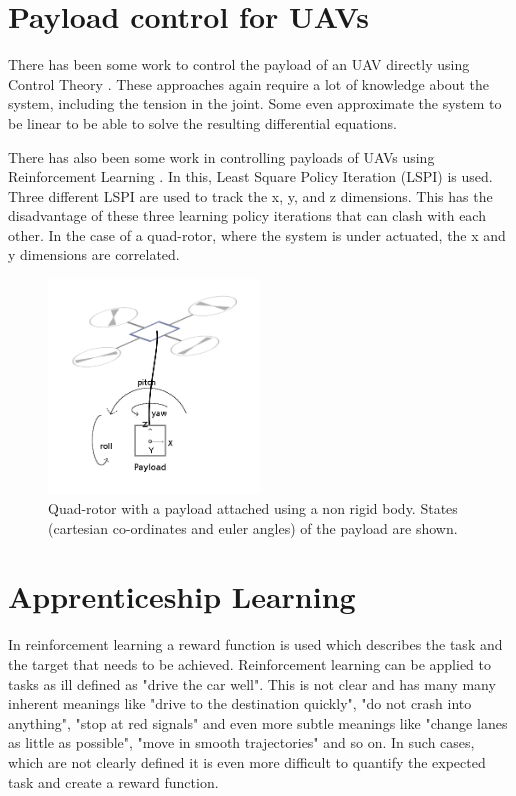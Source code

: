 \documentclass[hidelinks,BTech]{iitmdiss}
\begin{document}
\section{Payload control for UAVs}

There has been some work to control the payload of an UAV directly using Control Theory \cite{PayloadControlTheory,PayloadControlTheory2}. These approaches again require a lot of knowledge about the system, including the tension in the joint. Some even approximate the system to be linear to be able to solve the resulting differential equations.

There has also been some work in controlling payloads of UAVs using Reinforcement Learning \cite{PayloadLSPI}. In this, Least Square Policy Iteration (LSPI) is used. Three different LSPI are used to track the x, y, and z dimensions. This has the disadvantage of these three learning policy iterations that can clash with each other. In the case of a quad-rotor, where the system is under actuated, the x and y dimensions are correlated.

\begin{figure}[H]
  \centering
    \includegraphics[width=0.5\textwidth]{payload.png}
    \caption{Quad-rotor with a payload attached using a non rigid body. States (cartesian co-ordinates and euler angles) of the payload are shown.}
\end{figure}

\section{Apprenticeship Learning}

In reinforcement learning a reward function is used which describes the task and the target that needs to be achieved. Reinforcement learning can be applied to tasks as ill defined as "drive the car well". This is not clear and has many many inherent meanings like "drive to the destination quickly", "do not crash into anything", "stop at red signals" and even more subtle meanings like "change lanes as little as possible", "move in smooth trajectories" and so on. In such cases, which are not clearly defined it is even more difficult to quantify the expected task and create a reward function.
\end{document}
